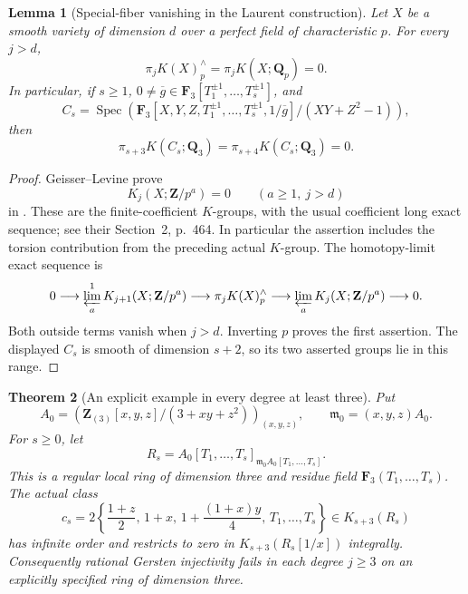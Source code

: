 \documentclass[11pt,a4paper]{article}
\newtheorem{theorem}{Theorem}[section]
\newtheorem{lemma}[theorem]{Lemma}
\theoremstyle{remark}
\newcommand{\Q}{\mathbf Q}
\newcommand{\Z}{\mathbf Z}
\newcommand{\F}{\mathbf F}
\newcommand{\Spec}{\operatorname{Spec}}
\begin{document}
\begin{lemma}[Special-fiber vanishing in the Laurent construction]
\label{lem:laurentspecialvanishing}
Let $X$ be a smooth variety of dimension $d$ over a perfect field
of characteristic $p$. For every $j>d$,
\[
 \pi_jK(X)^{\wedge}_p=\pi_jK(X;\Q_p)=0.
\]
In particular, if $s\geq1$, $0\ne\overline g\in
\F_3[T_1^{\pm1},\ldots,T_s^{\pm1}]$, and
\[
 C_s=\Spec\!\left(
 \F_3[X,Y,Z,T_1^{\pm1},\ldots,T_s^{\pm1},1/\overline g]
                         /(XY+Z^2-1)\right),
\]
then
\[
 \pi_{s+3}K(C_s;\Q_3)=\pi_{s+4}K(C_s;\Q_3)=0.
\]
\end{lemma}
\begin{proof}
Geisser--Levine prove
\[
 K_j(X;\Z/p^a)=0\qquad(a\geq1,\ j>d)
\]
in \cite[Theorem~8.4, p.~491]{GeisserLevineCharP}.
These are the finite-coefficient $K$-groups, with the usual
coefficient long exact sequence; see their Section~2, p.~464.
In particular the assertion includes the torsion contribution
from the preceding actual $K$-group.
The homotopy-limit exact sequence is
\[
 0\longrightarrow\varprojlim_a^{1}K_{j+1}(X;\Z/p^a)
 \longrightarrow\pi_jK(X)^{\wedge}_p
 \longrightarrow\varprojlim_a K_j(X;\Z/p^a)
 \longrightarrow0.
\]
Both outside terms vanish when $j>d$. Inverting $p$ proves the
first assertion. The displayed $C_s$ is smooth of dimension
$s+2$, so its two asserted groups lie in this range.
\end{proof}



\begin{theorem}[An explicit example in every degree at least three]
\label{thm:everydegreelaurent}
Put
\[
 A_0=\left(\Z_{(3)}[x,y,z]/(3+xy+z^2)\right)_{(x,y,z)},
 \qquad \mathfrak m_0=(x,y,z)A_0.
\]
For $s\geq0$, let
\[
 R_s=A_0[T_1,\ldots,T_s]_{\mathfrak m_0A_0[T_1,\ldots,T_s]}.
\]
This is a regular local ring of dimension three and residue field
$\F_3(T_1,\ldots,T_s)$. The actual class
\[
 c_s=2\left\{\frac{1+z}{2},\,1+x,\,
       1+\frac{(1+x)y}{4},\,T_1,\ldots,T_s\right\}
                    \in K_{s+3}(R_s)
\]
has infinite order and restricts to zero in $K_{s+3}(R_s[1/x])$
integrally. Consequently rational Gersten injectivity fails in
each degree $j\geq3$ on an explicitly specified ring of dimension
three.
\end{theorem}
\end{document}
